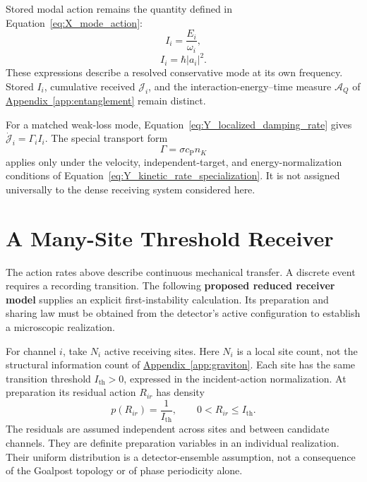 Stored modal action remains the quantity defined in Equation~\eqref{eq:X_mode_action}:
\begin{equation}
    I_i=\frac{E_i}{\omega_i},
    \label{eq:entanglement_modal_action_definition}
\end{equation}
\begin{equation}
    I_i=\hbar|a_i|^2.
    \label{eq:entanglement_action_amplitude_square}
\end{equation}
These expressions describe a resolved conservative mode at its own frequency. Stored $I_i$, cumulative received $\mathcal J_i$, and the interaction-energy--time measure $\mathcal A_Q$ of \hyperref[app:entanglement]{Appendix~\ref*{app:entanglement}} remain distinct.

For a matched weak-loss mode, Equation~\eqref{eq:Y_localized_damping_rate} gives $\dot{\mathcal J}_i=\Gamma_i I_i$. The special transport form
\begin{equation}
    \Gamma=\sigma c_{\mathrm P}n_K
    \label{eq:entanglement_quantum_damping}
\end{equation}
applies only under the velocity, independent-target, and energy-normalization conditions of Equation~\eqref{eq:Y_kinetic_rate_specialization}. It is not assigned universally to the dense receiving system considered here.

\section{A Many-Site Threshold Receiver}
\label{sec:entanglement_detector_capture}

The action rates above describe continuous mechanical transfer. A discrete event requires a recording transition. The following \textbf{proposed reduced receiver model} supplies an explicit first-instability calculation. Its preparation and sharing law must be obtained from the detector's active configuration to establish a microscopic realization.

For channel $i$, take $N_i$ active receiving sites. Here $N_i$ is a local site count, not the structural information count of \hyperref[app:graviton]{Appendix~\ref*{app:graviton}}. Each site has the same transition threshold $I_{\mathrm{th}}>0$, expressed in the incident-action normalization. At preparation its residual action $R_{ir}$ has density
\begin{equation}
    p(R_{ir})=\frac{1}{I_{\mathrm{th}}},
    \qquad 0<R_{ir}\leq I_{\mathrm{th}}.
    \label{eq:entanglement_uniform_threshold_phase}
\end{equation}
The residuals are assumed independent across sites and between candidate channels. They are definite preparation variables in an individual realization. Their uniform distribution is a detector-ensemble assumption, not a consequence of the Goalpost topology or of phase periodicity alone.

